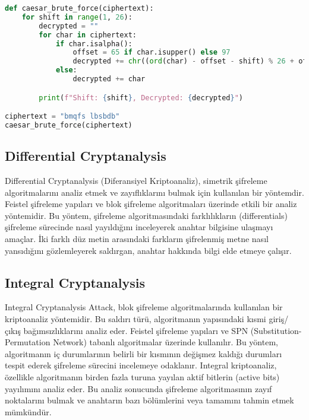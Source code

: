 \begin{lstlisting}[language=Python]
def caesar_brute_force(ciphertext):
    for shift in range(1, 26):
        decrypted = ""
        for char in ciphertext:
            if char.isalpha():
                offset = 65 if char.isupper() else 97
                decrypted += chr((ord(char) - offset - shift) % 26 + offset)
            else:
                decrypted += char

        print(f"Shift: {shift}, Decrypted: {decrypted}")

ciphertext = "bmqfs lbsbdb"
caesar_brute_force(ciphertext)
\end{lstlisting}

\newpage

\subsection{Differential Cryptanalysis}

Differential Cryptanalysis (Diferansiyel Kriptoanaliz), simetrik şifreleme algoritmalarını analiz etmek ve zayıflıklarını bulmak için kullanılan bir yöntemdir. Feistel şifreleme yapıları ve blok şifreleme algoritmaları üzerinde etkili bir analiz yöntemidir. Bu yöntem, şifreleme algoritmasındaki farklılıkların (differentials) şifreleme sürecinde nasıl yayıldığını inceleyerek anahtar bilgisine ulaşmayı amaçlar. İki farklı düz metin arasındaki farkların şifrelenmiş metne nasıl yansıdığını gözlemleyerek saldırgan, anahtar hakkında bilgi elde etmeye çalışır.

\newpage

\subsection{Integral Cryptanalysis}

Integral Cryptanalysis Attack, blok şifreleme algoritmalarında kullanılan bir kriptoanaliz yöntemidir. Bu saldırı türü, algoritmanın yapısındaki kısmi giriş/çıkış bağımsızlıklarını analiz eder. Feistel şifreleme yapıları ve SPN (Substitution-Permutation Network) tabanlı algoritmalar üzerinde kullanılır. Bu yöntem, algoritmanın iç durumlarının belirli bir kısmının değişmez kaldığı durumları tespit ederek şifreleme sürecini incelemeye odaklanır. Integral kriptoanaliz, özellikle algoritmanın birden fazla turuna yayılan aktif bitlerin (active bits) yayılımını analiz eder. Bu analiz sonucunda şifreleme algoritmasının zayıf noktalarını bulmak ve anahtarın bazı bölümlerini veya tamamını tahmin etmek mümkündür.

